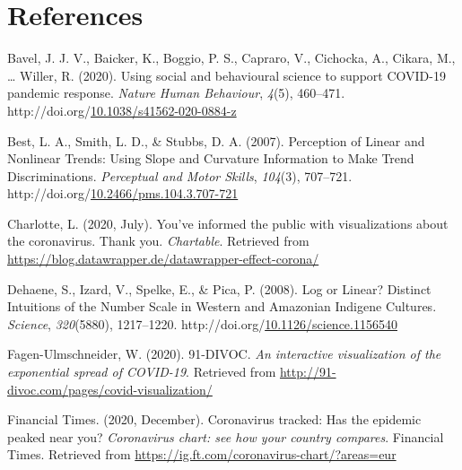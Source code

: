 \documentclass[print]{nuthesis}
\newlength{\cslhangindent}
\newenvironment{CSLReferences}%
{\setlength{\parindent}{0pt}%
\everypar{\setlength{\hangindent}{\cslhangindent}}\ignorespaces}%
{\par}
\begin{document}
\backmatter

\hypertarget{references}{%
\chapter*{References}\label{references}}

\noindent

\setlength{\parindent}{-0.20in}
\setlength{\leftskip}{0.20in}
\setlength{\parskip}{8pt}

\hypertarget{refs}{}
\begin{CSLReferences}{1}{0}
\leavevmode\hypertarget{ref-bavel_using_2020}{}%
Bavel, J. J. V., Baicker, K., Boggio, P. S., Capraro, V., Cichocka, A., Cikara, M., \ldots{} Willer, R. (2020). Using social and behavioural science to support {COVID}-19 pandemic response. \emph{Nature Human Behaviour}, \emph{4}(5), 460--471. http://doi.org/\href{https://doi.org/10.1038/s41562-020-0884-z}{10.1038/s41562-020-0884-z}

\leavevmode\hypertarget{ref-best_perception_2007}{}%
Best, L. A., Smith, L. D., \& Stubbs, D. A. (2007). Perception of {Linear} and {Nonlinear} {Trends}: {Using} {Slope} and {Curvature} {Information} to {Make} {Trend} {Discriminations}. \emph{Perceptual and Motor Skills}, \emph{104}(3), 707--721. http://doi.org/\href{https://doi.org/10.2466/pms.104.3.707-721}{10.2466/pms.104.3.707-721}

\leavevmode\hypertarget{ref-lisa_charlotte_2020}{}%
Charlotte, L. (2020, July). You've informed the public with visualizations about the coronavirus. Thank you. \emph{Chartable}. Retrieved from \url{https://blog.datawrapper.de/datawrapper-effect-corona/}

\leavevmode\hypertarget{ref-dehaeneLogLinearDistinct2008}{}%
Dehaene, S., Izard, V., Spelke, E., \& Pica, P. (2008). Log or {Linear}? {Distinct} {Intuitions} of the {Number} {Scale} in {Western} and {Amazonian} {Indigene} {Cultures}. \emph{Science}, \emph{320}(5880), 1217--1220. http://doi.org/\href{https://doi.org/10.1126/science.1156540}{10.1126/science.1156540}

\leavevmode\hypertarget{ref-wade_fagen_ulmschneider_2020}{}%
Fagen-Ulmschneider, W. (2020). 91-DIVOC. \emph{An interactive visualization of the exponential spread of COVID-19}. Retrieved from \url{http://91-divoc.com/pages/covid-visualization/}

\leavevmode\hypertarget{ref-financial_times_2020}{}%
Financial Times. (2020, December). Coronavirus tracked: Has the epidemic peaked near you? \emph{Coronavirus chart: see how your country compares}. Financial Times. Retrieved from \url{https://ig.ft.com/coronavirus-chart/?areas=eur}


\end{CSLReferences}
\end{document}

